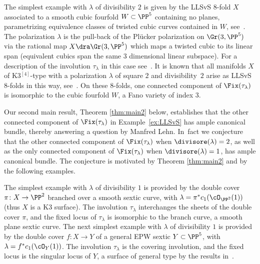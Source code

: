 \begin{exam}\label{ex:LLSvS}
The simplest example with $\lambda$ of divisibility $2$ is given by the LLSvS $8$-fold $X$ associated to a smooth cubic fourfold $W\subset\PP^5$ containing no planes, parametrizing equivalence classes of twisted cubic curves contained in $W$, see~\cite{LLSvS:cubics}.
The polarization $\lambda$ is the pull-back of the Plücker polarization on $\Gr(3,\PP^5)$ via the rational map $X\dra \Gr(3,\PP^5)$ which maps a twisted cubic to its linear span (equivalent cubics span the same $3$ dimensional linear subspace).
For a description of the involution $\tau_\lambda$ in this case see~\cite{Lehn:Oberwolfach,CCL:Chow}. It is known that all \HK manifolds $X$ of K3$^{[4]}$-type with a polarization $\lambda$ of square $2$ and divisibility~$2$ arise as LLSvS $8$-folds in this way, see~\cite[Prop.\,B.12]{Debarre:Survey}. On these $8$-folds, one connected component of $\Fix(\tau_{\lambda})$ is isomorphic to the cubic fourfold $W$, a Fano variety of index $3$.
\end{exam}

Our second main result, Theorem \ref{thm:main2} below, establishes that the other connected component of $\Fix(\tau_{\lambda})$ in Example~\ref{ex:LLSvS} has ample canonical bundle, thereby answering a question by Manfred Lehn. In~fact we conjecture that the other connected component of $\Fix(\tau_{\lambda})$ when $\divisore(\lambda)=2$, as well as the only
connected component of $\Fix(\tau_{\lambda})$ when $\divisore(\lambda)=1$, has ample canonical bundle. The conjecture is motivated by Theorem \ref{thm:main2} and by the following examples.

\begin{exam}\label{ex:divuno}
The simplest example with $\lambda$ of divisibility $1$ is provided by the double cover $\pi\colon X\to\PP^2$ branched over a smooth sextic curve, with $\lambda=\pi^{*}c_1(\cO_{\PP^2}(1))$ (thus $X$ is a K3 surface). The involution $\tau_\lambda$ interchanges the sheets of the double cover $\pi$, and the fixed locus of $\tau_\lambda$ is isomorphic to the branch curve, \ie a smooth plane sextic curve. The next simplest example
with $\lambda$ of divisibility $1$ is provided by the double cover $f\colon X\to Y$ of a general EPW sextic $Y\subset \PP^5$, with $\lambda=f^{*}c_1(\cO_{Y}(1))$. The involution $\tau_\lambda$ is the covering involution, and the fixed locus is the singular locus of $Y$, a surface
of general type by the results in~\cite{Kieran:numhilb2}.
\end{exam}

